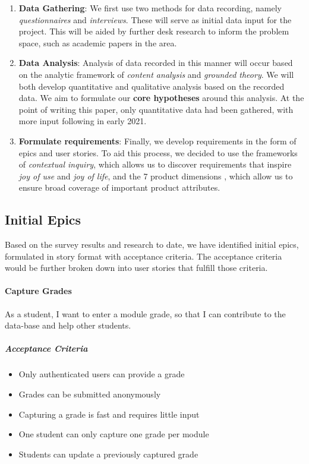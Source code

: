 \begin{enumerate}
    \item \textbf{Data Gathering}: We first use two methods for data recording, namely \textit{questionnaires} and \textit{interviews}. These will serve as initial data input for the project. This will be aided by further desk research to inform the problem space, such as academic papers in the area.
    \item \textbf{Data Analysis}: Analysis of data recorded in this manner will occur based on the analytic framework of \textit{content analysis} and \textit{grounded theory}. We will both develop quantitative and qualitative analysis based on the recorded data. We aim to formulate our \textbf{core hypotheses} around this analysis. At the point of writing this paper, only quantitative data had been gathered, with more input following in early 2021.
    \item \textbf{Formulate requirements}: Finally, we develop requirements in the form of epics and user stories. To aid this process, we decided to use the frameworks of \textit{contextual inquiry}, which allows us to discover requirements that inspire \textit{joy of use} and \textit{joy of life}, and the 7 product dimensions \cite{gottesdiener_gorman_2014}, which allow us to ensure broad coverage of important product attributes.
\end{enumerate}



\subsection{Initial Epics}
Based on the survey results and research to date, we have identified initial epics, formulated in story format with acceptance criteria. The acceptance criteria would be further broken down into user stories that fulfill those criteria.

\paragraph{Capture Grades} As a student, I want to enter a  module  grade,   so  that  I can  contribute  to  the  data-base and help other students.
\subparagraph{Acceptance Criteria}
\begin{itemize}
    \item Only authenticated users can provide a grade
    \item Grades can be submitted anonymously
    \item Capturing a grade is fast and requires little input
    \item One student can only capture one grade per module
    \item Students can update a previously captured grade
\end{itemize}

